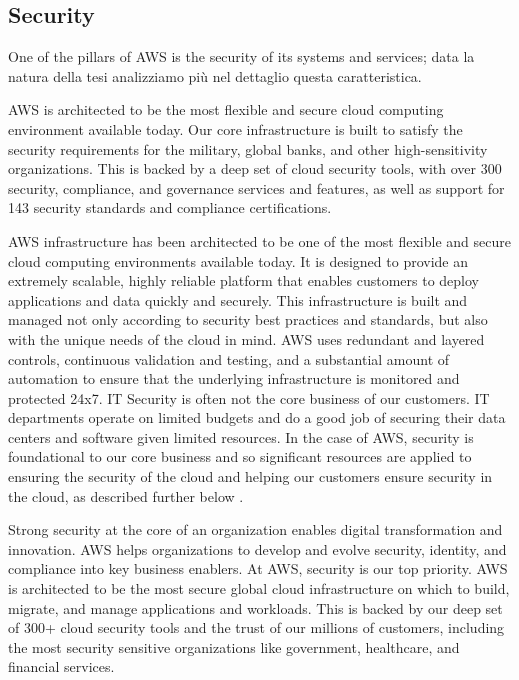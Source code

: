 \subsection{Security}
One of the pillars of AWS is the security of its systems and services; data la natura della tesi analizziamo più nel dettaglio questa caratteristica.

AWS is architected to be the most flexible and secure cloud computing environment available today. Our core infrastructure is built to satisfy the security requirements for the military, global banks, and other high-sensitivity organizations. This is backed by a deep set of cloud security tools, with over 300 security, compliance, and governance services and features, as well as support for 143 security standards and compliance certifications.

AWS infrastructure has been architected to be one of the most flexible and secure cloud computing environments available today. It is designed to provide an extremely scalable, highly reliable platform that enables customers to deploy applications and data quickly and securely. This infrastructure is built and managed not only according to security best practices and standards, but also with the unique needs of the cloud in mind. AWS uses redundant and layered controls, continuous validation and testing, and a substantial amount of automation to ensure that the underlying infrastructure is monitored and protected 24x7. IT Security is often not the core business of our customers. IT departments operate on limited budgets and do a good job of securing their data centers and software given limited resources. In the case of AWS, security is foundational to our core business and so significant resources are applied to ensuring the security of the cloud and helping our customers ensure security in the cloud, as described further below \cite{AWSCloudComputing}. 

Strong security at the core of an organization enables digital transformation and innovation. AWS helps organizations to develop and evolve security, identity, and compliance into key business enablers. At AWS, security is our top priority. AWS is architected to be the most secure global cloud infrastructure on which to build, migrate, and manage applications and workloads. This is backed by our deep set of 300+ cloud security tools and the trust of our millions of customers, including the most security sensitive organizations like government, healthcare, and financial services.

